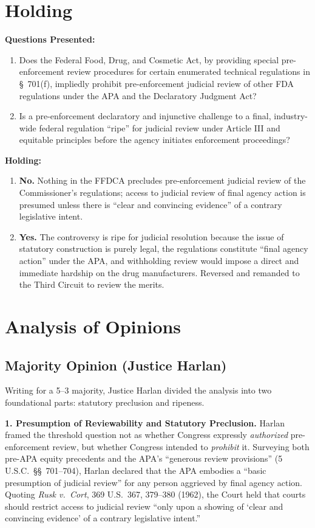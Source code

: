 \documentclass[12pt]{article}
\begin{document}
\section{Holding}
\textbf{Questions Presented:}

\begin{enumerate}
    \item Does the Federal Food, Drug, and Cosmetic Act, by providing special pre-enforcement review procedures for certain enumerated technical regulations in \S~701(f), impliedly prohibit pre-enforcement judicial review of other FDA regulations under the APA and the Declaratory Judgment Act?
    \item Is a pre-enforcement declaratory and injunctive challenge to a final, industry-wide federal regulation ``ripe'' for judicial review under Article III and equitable principles before the agency initiates enforcement proceedings?
\end{enumerate}

\textbf{Holding:}

\begin{enumerate}
    \item \textbf{No.} Nothing in the FFDCA precludes pre-enforcement judicial review of the Commissioner's regulations; access to judicial review of final agency action is presumed unless there is ``clear and convincing evidence'' of a contrary legislative intent.
    \item \textbf{Yes.} The controversy is ripe for judicial resolution because the issue of statutory construction is purely legal, the regulations constitute ``final agency action'' under the APA, and withholding review would impose a direct and immediate hardship on the drug manufacturers. Reversed and remanded to the Third Circuit to review the merits.
\end{enumerate}

\section{Analysis of Opinions}
\subsection{Majority Opinion (Justice Harlan)}

Writing for a 5--3 majority, Justice Harlan divided the analysis into two foundational parts: statutory preclusion and ripeness.

\textbf{1. Presumption of Reviewability and Statutory Preclusion.}
Harlan framed the threshold question not as whether Congress expressly \emph{authorized} pre-enforcement review, but whether Congress intended to \emph{prohibit} it. Surveying both pre-APA equity precedents and the APA's ``generous review provisions'' (5 U.S.C.\ \S\S~701--704), Harlan declared that the APA embodies a ``basic presumption of judicial review'' for any person aggrieved by final agency action. Quoting \textit{Rusk v.\ Cort}, 369 U.S.\ 367, 379--380 (1962), the Court held that courts should restrict access to judicial review ``only upon a showing of `clear and convincing evidence' of a contrary legislative intent.''
\end{document}
